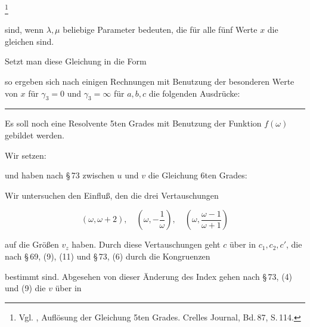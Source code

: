 %
\footnote{Vgl. , Auflösung der Gleichung 5ten Grades. Crelles Journal, Bd.\,87, S.\,114.}

sind, wenn $\lambda, \mu$ beliebige Parameter bedeuten, die für alle fünf
Werte $x$ die gleichen sind.

Setzt man diese Gleichung in die Form


so ergeben sich nach einigen Rechnungen mit Benutzung der besonderen
Werte von $x$ für $\gamma_3=0$ und $\gamma_3=\infty$ für $a, b, c$ die
folgenden Ausdrücke:


\par\noindent\rule{0.3\linewidth}{0.4pt}\par

Es soll noch eine Resolvente 5ten Grades mit Benutzung der Funktion
$f(\omega)$ gebildet werden.

Wir setzen:


und haben nach §\,73 zwischen $u$ und $v$ die Gleichung 6ten Grades:


Wir untersuchen den Einfluß, den die drei Vertauschungen

\[
(\omega, \omega+2), \quad \left(\omega, -\frac{1}{\omega}\right), \quad
\left(\omega, \frac{\omega-1}{\omega+1}\right)
\]

auf die Größen $v_z$ haben. Durch diese Vertauschungen geht $c$ über in
$c_1, c_2, c'$, die nach §\,69, (9), (11) und §\,73, (6) durch die
Kongruenzen


bestimmt sind. Abgesehen von dieser Änderung des Index gehen nach §\,73,
(4) und (9) die $v$ über in


